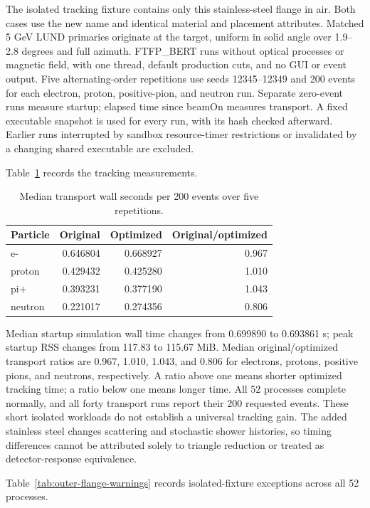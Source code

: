 The isolated tracking fixture contains only this stainless-steel flange in air. Both cases use the new name
and identical material and placement attributes. Matched 5 GeV LUND primaries originate at the target,
uniform in solid angle over 1.9--2.8 degrees and full azimuth. FTFP\_BERT runs without optical processes or
magnetic field, with one thread, default production cuts, and no GUI or event output. Five alternating-order
repetitions use seeds 12345--12349 and 200 events for each electron, proton, positive-pion, and neutron run.
Separate zero-event runs measure startup; elapsed time since beamOn measures transport. A fixed executable
snapshot is used for every run, with its hash checked afterward. Earlier runs interrupted by sandbox
resource-timer restrictions or invalidated by a changing shared executable are excluded.

Table~\ref{tab:outer-flange-timing} records the tracking measurements.

\begin{table}[htbp]
\centering
\caption{Median transport wall seconds per 200 events over five repetitions.}
\label{tab:outer-flange-timing}
\begin{tabular}{lrrr}
\toprule
Particle & Original & Optimized & Original/optimized \\
\midrule
e- & 0.646804 & 0.668927 & 0.967 \\
proton & 0.429432 & 0.425280 & 1.010 \\
pi+ & 0.393231 & 0.377190 & 1.043 \\
neutron & 0.221017 & 0.274356 & 0.806 \\
\bottomrule
\end{tabular}
\end{table}

Median startup simulation wall time changes from 0.699890 to 0.693861 s; peak startup RSS changes from
117.83 to 115.67 MiB. Median original/optimized transport ratios are 0.967, 1.010, 1.043, and 0.806 for
electrons, protons, positive pions, and neutrons, respectively. A ratio above one means shorter optimized
tracking time; a ratio below one means longer time. All 52 processes complete normally, and all forty
transport runs report their 200 requested events. These short isolated workloads do not establish a
universal tracking gain. The added stainless steel changes scattering and stochastic shower histories, so
timing differences cannot be attributed solely to triangle reduction or treated as detector-response
equivalence.

Table~\ref{tab:outer-flange-warnings} records isolated-fixture exceptions across all 52 processes.


